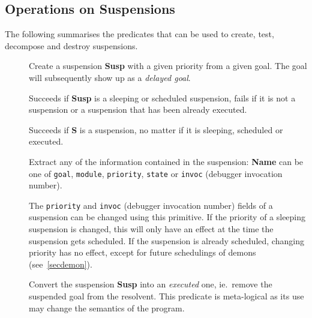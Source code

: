 \subsection{Operations on Suspensions}
The following summarises the predicates that can be used to create, test,
decompose and destroy suspensions.
\begin{description}
\item[]
\item[]
Create a suspension {\bf Susp} with a given priority from a given goal.
The goal will subsequently show up as a {\it delayed goal}.

\item[]
Succeeds if {\bf Susp} is a sleeping or scheduled suspension,
fails if it is not a suspension or a suspension that has been already executed.

\item[]
Succeeds if {\bf S} is a suspension, no matter if it is
sleeping, scheduled or executed.

\item[]
Extract any of the information contained in the suspension:
{\bf Name} can be one of
\verb.goal., \verb.module., \verb.priority., \verb.state. or \verb.invoc. (debugger invocation number).


\item[]
The \verb.priority. and \verb.invoc. (debugger invocation number) fields
of a suspension can be changed using this primitive.
If the priority of a sleeping suspension is changed,
this will only have an effect at the time the suspension gets
scheduled. If the suspension is already scheduled, changing
priority has no effect, except for future schedulings of demons
(see~\ref{secdemon}).


\item[]
Convert the suspension {\bf Susp} into an {\it executed}
one, ie.\ remove the suspended goal from the resolvent.
This predicate is meta-logical as its use may
change the semantics of the program.
\end{description}



